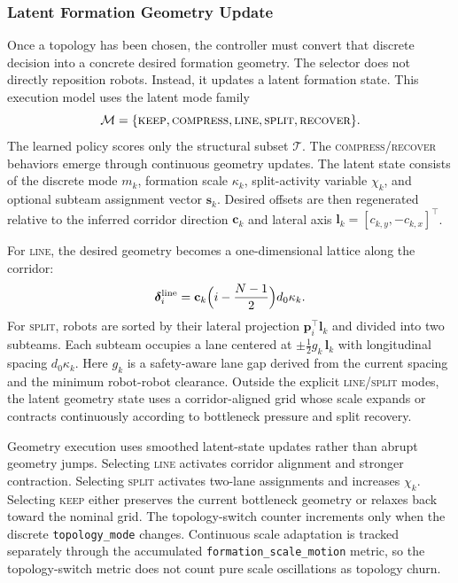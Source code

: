 \documentclass{ieeeaccess}
\newcommand{\cT}{\mathcal{T}}
\newcommand{\bfp}{\mathbf{p}}
\begin{document}
\subsubsection{Latent Formation Geometry Update}
\label{sec:geometry_execution}

Once a topology has been chosen, the controller must convert that
discrete decision into a concrete desired formation geometry. The
selector does not directly reposition robots. Instead, it updates a
latent formation state. This execution model uses the latent mode
family
\begin{equation}
\mathcal{M}=\{\textsc{keep},\textsc{compress},\textsc{line},
\textsc{split},\textsc{recover}\}.
\end{equation}
The learned policy scores only the structural subset $\cT$. The
\textsc{compress}/\textsc{recover} behaviors emerge through continuous
geometry updates. The latent state consists of the discrete mode $m_k$,
formation scale $\kappa_k$, split-activity variable $\chi_k$, and
optional subteam assignment vector $\mathbf{s}_k$. Desired offsets are
then regenerated relative to the inferred corridor direction
$\mathbf{c}_k$ and lateral axis
$\mathbf{l}_k=[c_{k,y},-c_{k,x}]^\top$.

For \textsc{line}, the desired geometry becomes a one-dimensional lattice along the corridor:
\begin{equation}
\bm{\delta}_i^{\mathrm{line}} =
\mathbf{c}_k \Bigl(i-\frac{N-1}{2}\Bigr) d_0 \kappa_k.
\label{eq:line_offsets}
\end{equation}
For \textsc{split}, robots are sorted by their lateral projection
$\bfp_i^\top \mathbf{l}_k$ and divided into two subteams. Each subteam
occupies a lane centered at $\pm \tfrac{1}{2} g_k\,\mathbf{l}_k$ with
longitudinal spacing $d_0 \kappa_k$. Here $g_k$ is a safety-aware lane
gap derived from the current spacing and the minimum robot-robot
clearance. Outside the explicit \textsc{line}/\textsc{split} modes, the
latent geometry state uses a corridor-aligned grid whose scale expands
or contracts continuously according to bottleneck pressure and split
recovery.

Geometry execution uses smoothed latent-state updates rather than
abrupt geometry jumps. Selecting \textsc{line} activates corridor
alignment and stronger contraction. Selecting \textsc{split} activates
two-lane assignments and increases $\chi_k$. Selecting \textsc{keep}
either preserves the current bottleneck geometry or relaxes back toward
the nominal grid. The topology-switch counter increments only when the
discrete \texttt{topology\_mode} changes. Continuous scale adaptation
is tracked separately through the accumulated
\texttt{formation\_scale\_motion} metric, so the topology-switch metric
does not count pure scale oscillations as topology churn.
\end{document}
